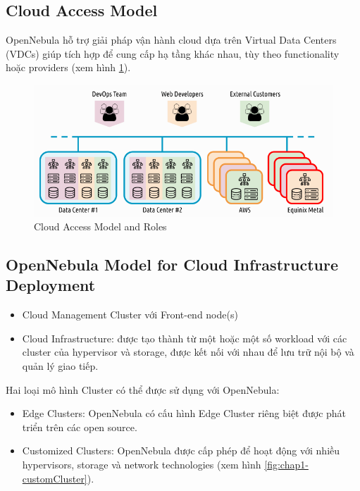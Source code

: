 \subsection{Cloud Access Model}
OpenNebula hỗ trợ giải pháp vận hành cloud dựa trên Virtual Data Centers (VDCs) giúp tích hợp để cung cấp hạ tầng khác nhau, tùy theo functionality hoặc providers (xem hình \ref{fig:chap1-cloud-access-model}).
\begin{figure}
    \centering
    \includegraphics*[scale=0.4]{graphics/main/overivew/chap1-cloud-access-model.png}
    \caption{Cloud Access Model and Roles}
    \label{fig:chap1-cloud-access-model}
\end{figure}

\subsection{OpenNebula Model for Cloud Infrastructure Deployment}
\begin{itemize}
    \item Cloud Management Cluster với Front-end node(s)
    \item Cloud Infrastructure: được tạo thành từ một hoặc một số  workload với các cluster của hypervisor và storage, được kết nối với nhau để lưu trữ nội bộ và quản lý giao tiếp.
\end{itemize} 

Hai loại mô hình Cluster có thể được sử dụng với OpenNebula:
\begin{itemize}
    \item Edge Clusters: OpenNebula có cấu hình Edge Cluster riêng biệt được phát triển trên các open source. 
    \item Customized Clusters: OpenNebula được cấp phép để hoạt động với nhiều hypervisors, storage và network technologies (xem hình \ref{fig:chap1-customCluster}). 
\end{itemize}

